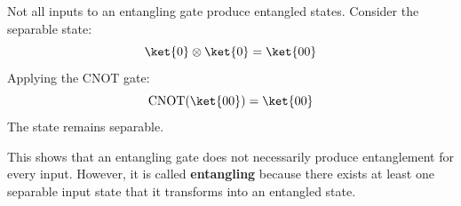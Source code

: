 \begin{examplebox}
    Not all inputs to an entangling gate produce entangled states. Consider the separable state:
    \begin{equation*}
        \ket{0} \otimes \ket{0} = \ket{00}
    \end{equation*}
    Applying the CNOT gate:
    \begin{equation*}
        \text{CNOT}(\ket{00}) = \ket{00}
    \end{equation*}
    The state remains separable.

    \highspace
    This shows that an entangling gate does not necessarily produce entanglement for every input. However, it is called \textbf{entangling} because there exists at least one separable input state that it transforms into an entangled state.
\end{examplebox}

